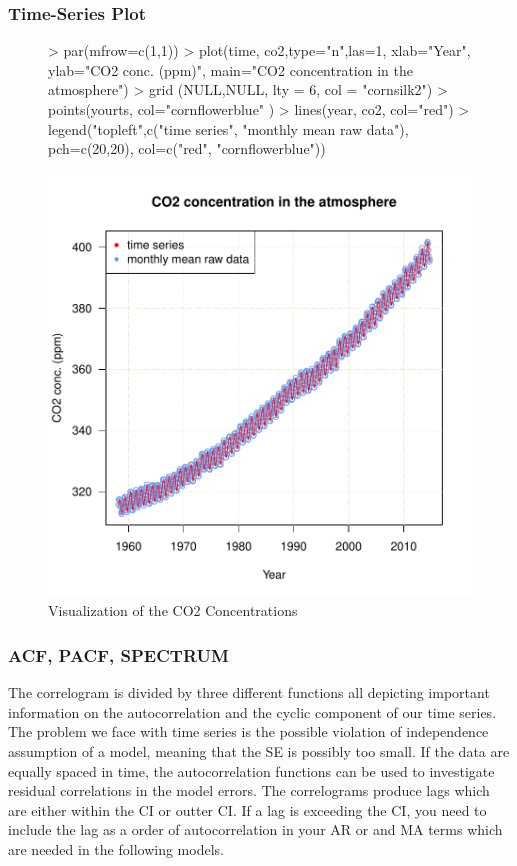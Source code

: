 \documentclass[10pt, a4paper]{article} %
\begin{document}
\subsubsection{Time-Series Plot}
\begin{figure}[H]
\centering
\begin{Schunk}
\begin{Sinput}
> par(mfrow=c(1,1))
> plot(time, co2,type="n",las=1, xlab="Year", ylab="CO2 conc. (ppm)",
         main="CO2 concentration in the atmosphere")
> grid (NULL,NULL, lty = 6, col = "cornsilk2")
> points(yourts, col="cornflowerblue" )
> lines(year, co2, col="red")
> legend("topleft",c("time series", "monthly mean raw data"),
 pch=c(20,20), col=c("red", "cornflowerblue"))
\end{Sinput}
\end{Schunk}
\includegraphics{FINAL_VERSION-fig1visualize}
\caption{Visualization of the CO2 Concentrations}
\label{fig1visualize}
\end{figure}

\subsubsection{ACF, PACF, SPECTRUM}

\noindent The correlogram is divided by three different functions all depicting important information on the autocorrelation and the cyclic component of our time series.  The problem we face with time series is the possible violation of independence assumption of a model, meaning that the SE is possibly too small. If the data are equally spaced in time,  the autocorrelation functions can be used to investigate residual  correlations in the model errors. The correlograms produce lags which are either within the CI or outter CI. If a lag is exceeding the CI, you need to include the lag as a order of autocorrelation in your AR or\- and MA terms which are needed in the following models. 
\end{document}
